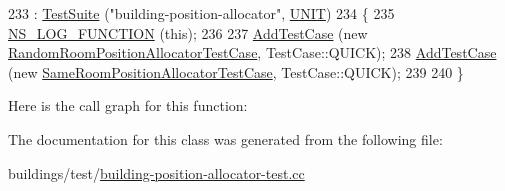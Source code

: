 \begin{DoxyCode}
233   : \hyperlink{classns3_1_1TestSuite_a904b0c40583b744d30908aeb94636d1a}{TestSuite} (\textcolor{stringliteral}{"building-position-allocator"}, \hyperlink{classns3_1_1TestSuite_a1ebfcab34ec8161e085e8e3a1855eae0a3885375a3787abf60431f8454b3cadbd}{UNIT})
234 \{
235   \hyperlink{log-macros-disabled_8h_a90b90d5bad1f39cb1b64923ea94c0761}{NS\_LOG\_FUNCTION} (\textcolor{keyword}{this});
236 
237   \hyperlink{classns3_1_1TestCase_a3718088e3eefd5d6454569d2e0ddd835}{AddTestCase} (\textcolor{keyword}{new} \hyperlink{classRandomRoomPositionAllocatorTestCase}{RandomRoomPositionAllocatorTestCase}, 
      TestCase::QUICK);
238   \hyperlink{classns3_1_1TestCase_a3718088e3eefd5d6454569d2e0ddd835}{AddTestCase} (\textcolor{keyword}{new} \hyperlink{classSameRoomPositionAllocatorTestCase}{SameRoomPositionAllocatorTestCase}, 
      TestCase::QUICK);
239 
240 \}
\end{DoxyCode}


Here is the call graph for this function\+:




The documentation for this class was generated from the following file\+:\begin{DoxyCompactItemize}
\item 
buildings/test/\hyperlink{building-position-allocator-test_8cc}{building-\/position-\/allocator-\/test.\+cc}\end{DoxyCompactItemize}

